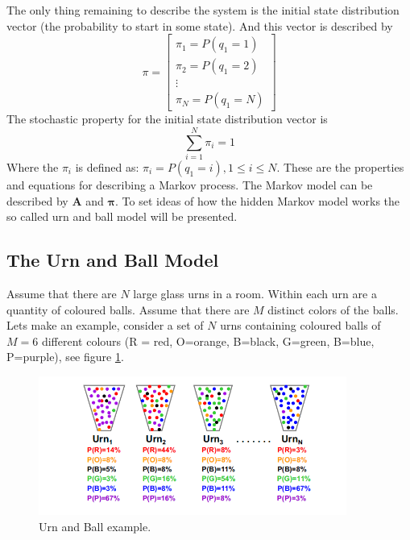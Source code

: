 \documentclass[12pt, a4paper, twoside]{report}
\begin{document}
The only thing remaining to describe the system is the initial state distribution vector (the probability to start in some state). And this vector is described by
\begin{equation}
\pi = \begin{bmatrix}
\pi_1 \! = \! P(q_1 \! = \! 1) \\ 
\pi_2 \! = \! P(q_1 \! = \! 2) \\ 
\vdots \\ 
\pi_N \! = \! P(q_1 \! = \! N)
\end{bmatrix}
\end{equation}
The stochastic property for the initial state distribution vector is
\begin{equation}
\sum_{i=1}^{N} \pi_i = 1
\end{equation}
Where the $\pi_i$ is defined as: $\pi_i \! = \! P(q_1 \! = \! i), 1 \leq i \leq N$. These are the properties and equations for describing a Markov process. The Markov model can be described by $\mathbf{A}$ and $\mathbf{\pi}$. To set ideas of how the hidden Markov model works the so called urn and ball model will be presented.

\subsection{The Urn and Ball Model}
Assume that there are $N$ large glass urns in a room. Within each urn are a quantity of coloured balls. Assume that there are $M$ distinct colors of the balls. Lets make an example, consider a set of $N$ urns containing coloured balls of $M = 6$ different colours (R = red, O=orange, B=black, G=green, B=blue, P=purple), see figure \ref{fig:urn-ball}.
\begin{figure}[!h]
	\centering
	\includegraphics[width=0.9\textwidth]
	{images/chapter4/urn-ball}
	\caption{Urn and Ball example.}
	\label{fig:urn-ball}
\end{figure}
\end{document}
